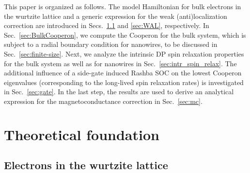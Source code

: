 \documentclass[superscriptaddress,noshowpacs,noshowkeys, twocolumn, floatfix,aps, prb,reprint]{revtex4-1}
\begin{document}
This paper is organized as follows.
The model Hamiltonian for bulk electrons in the wurtzite lattice and a generic expression for the weak (anti)localization correction are introduced in Secs.~\ref{sec:model} and \ref{sec:WAL}, respectively.
In Sec.~\ref{sec:BulkCooperon}, we compute the Cooperon for the bulk system, which is subject to a radial boundary condition for nanowires, to be discussed in Sec.~\ref{sec:finite-size}.
Next, we analyze the intrinsic DP spin relaxation properties for the bulk system as well as for nanowires in Sec.~\ref{sec:intr_spin_relax}.
The additional influence of a side-gate induced Rashba SOC on the lowest Cooperon eigenvalues (corresponding to the long-lived spin relaxation rates) is investigated in Sec.~\ref{sec:gate}.
In the last step, the results are used to derive an analytical expression for the magnetoconductance correction in Sec.~\ref{sec:mc}.




\section{Theoretical foundation}\label{sec:foundation}

\subsection{Electrons in the wurtzite lattice}\label{sec:model}
\end{document}

